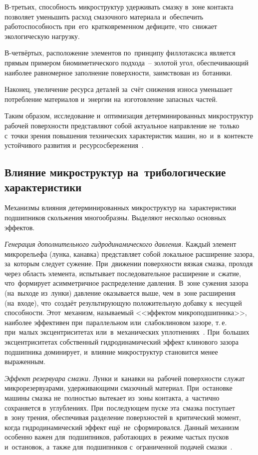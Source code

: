 В-третьих, способность микроструктур удерживать смазку в~зоне контакта позволяет уменьшить расход смазочного материала и~обеспечить работоспособность при~его~кратковременном дефиците, что~снижает экологическую нагрузку.

В-четвёртых, расположение элементов по~принципу филлотаксиса является прямым примером биомиметического подхода~-- золотой угол, обеспечивающий наиболее равномерное заполнение поверхности, заимствован из~ботаники.

Наконец, увеличение ресурса деталей за~счёт снижения износа уменьшает потребление материалов и~энергии на~изготовление запасных частей.

Таким образом, исследование и~оптимизация детерминированных микроструктур рабочей поверхности представляют собой актуальное направление не~только с~точки зрения повышения технических характеристик машин, но~и~в~контексте устойчивого развития и~ресурсосбережения~\cite{bashmur2024b,bashmur2024a}.

\subsection{Влияние микроструктур на~трибологические характеристики}

Механизмы влияния детерминированных микроструктур на~характеристики подшипников скольжения многообразны. Выделяют несколько основных эффектов.

\textit{Генерация дополнительного гидродинамического давления.} Каждый элемент микрорельефа (лунка, канавка) представляет собой локальное расширение зазора, за~которым следует сужение. При~движении поверхности вязкая смазка, проходя через область элемента, испытывает последовательное расширение и~сжатие, что~формирует асимметричное распределение давления. В~зоне сужения зазора (на~выходе из~лунки) давление оказывается выше, чем~в~зоне расширения (на~входе), что~создаёт результирующую положительную добавку к~несущей способности. Этот~механизм, называемый <<эффектом микроподшипника>>, наиболее эффективен при~параллельном или~слабоклиновом зазоре, т.\,е. при~малых эксцентриситетах или~в~механических уплотнениях~\cite{senatore2018,galda2019}. При~больших эксцентриситетах собственный гидродинамический эффект клинового зазора подшипника доминирует, и~влияние микроструктур становится менее выраженным.

\textit{Эффект резервуара смазки.} Лунки и~канавки на~рабочей поверхности служат микрорезервуарами, удерживающими смазочный материал. При~остановке машины смазка не~полностью вытекает из~зоны контакта, а~частично сохраняется в~углублениях. При~последующем пуске эта~смазка поступает в~зону трения, обеспечивая разделение поверхностей в~критический момент, когда гидродинамический эффект ещё~не~сформировался. Данный механизм особенно важен для~подшипников, работающих в~режиме частых пусков и~остановок, а~также для~подшипников с~ограниченной подачей смазки~\cite{bashmur2022,filho2021}.

